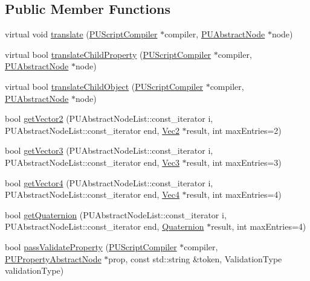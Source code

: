 \subsection*{Public Member Functions}
\begin{DoxyCompactItemize}
\item 
virtual void \hyperlink{classPUScriptTranslator_a9ff2cdfda9ea8db6fd716e7b69dbe79b}{translate} (\hyperlink{classPUScriptCompiler}{P\+U\+Script\+Compiler} $\ast$compiler, \hyperlink{classPUAbstractNode}{P\+U\+Abstract\+Node} $\ast$node)
\item 
virtual bool \hyperlink{classPUScriptTranslator_a0374d83a8a04e57918975d525e0f8fe8}{translate\+Child\+Property} (\hyperlink{classPUScriptCompiler}{P\+U\+Script\+Compiler} $\ast$compiler, \hyperlink{classPUAbstractNode}{P\+U\+Abstract\+Node} $\ast$node)
\item 
virtual bool \hyperlink{classPUScriptTranslator_ab587d01348ae3e678cb700c719b2b113}{translate\+Child\+Object} (\hyperlink{classPUScriptCompiler}{P\+U\+Script\+Compiler} $\ast$compiler, \hyperlink{classPUAbstractNode}{P\+U\+Abstract\+Node} $\ast$node)
\item 
bool \hyperlink{classPUScriptTranslator_ab1b2552dcb55bfde190225ce5f9dabdc}{get\+Vector2} (P\+U\+Abstract\+Node\+List\+::const\+\_\+iterator i, P\+U\+Abstract\+Node\+List\+::const\+\_\+iterator end, \hyperlink{classVec2}{Vec2} $\ast$result, int max\+Entries=2)
\item 
bool \hyperlink{classPUScriptTranslator_a3362c25448c91a55aca1114c69ddbc97}{get\+Vector3} (P\+U\+Abstract\+Node\+List\+::const\+\_\+iterator i, P\+U\+Abstract\+Node\+List\+::const\+\_\+iterator end, \hyperlink{classVec3}{Vec3} $\ast$result, int max\+Entries=3)
\item 
bool \hyperlink{classPUScriptTranslator_a322d97ac1f6308ea0dda66b5b1c8b793}{get\+Vector4} (P\+U\+Abstract\+Node\+List\+::const\+\_\+iterator i, P\+U\+Abstract\+Node\+List\+::const\+\_\+iterator end, \hyperlink{classVec4}{Vec4} $\ast$result, int max\+Entries=4)
\item 
bool \hyperlink{classPUScriptTranslator_a0181ae407bbaabee7ea22cad4053c601}{get\+Quaternion} (P\+U\+Abstract\+Node\+List\+::const\+\_\+iterator i, P\+U\+Abstract\+Node\+List\+::const\+\_\+iterator end, \hyperlink{classQuaternion}{Quaternion} $\ast$result, int max\+Entries=4)
\item 
bool \hyperlink{classPUScriptTranslator_ab2fc7f172c43c3d64bc05d86ddc1bcb9}{pass\+Validate\+Property} (\hyperlink{classPUScriptCompiler}{P\+U\+Script\+Compiler} $\ast$compiler, \hyperlink{classPUPropertyAbstractNode}{P\+U\+Property\+Abstract\+Node} $\ast$prop, const std\+::string \&token, Validation\+Type validation\+Type)

\end{DoxyCompactItemize}
